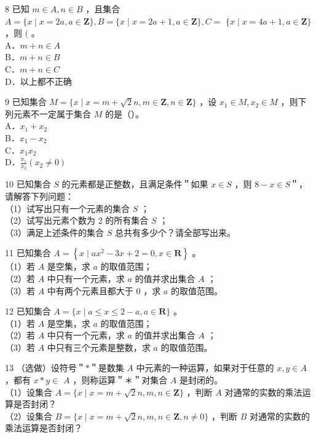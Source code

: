 \documentclass[10pt]{article}
\begin{document}
8 已知 \(m \in A, n \in B\) ，且集合 \(A=\{x \mid x=2 a, a \in \mathbf{Z}\}, B=\{x \mid x=2 a+1, a \in \mathbf{Z}\}, C=\) \(\{x \mid x=4 a+1, a \in \mathbf{Z}\}\) ，则 \((\) 。\\
A．\(m+n \in A\)\\
B．\(m+n \in B\)\\
C．\(m+n \in C\)\\
D．以上都不正确

9 已知集合 \(M=\{x \mid x=m+\sqrt{2} n, m \in \mathbf{Z}, n \in \mathbf{Z}\}\) ，设 \(x_{1} \in M, x_{2} \in M\) ，则下列元素不一定属于集合 \(M\) 的是（）。\\
A．\(x_{1}+x_{2}\)\\
B．\(x_{1}-x_{2}\)\\
C．\(x_{1} x_{2}\)\\
D．\(\frac{x_{1}}{x_{2}}\left(x_{2} \neq 0\right)\)

10 已知集合 \(S\) 的元素都是正整数，且满足条件＂如果 \(x \in S\) ，则 \(8-x \in S\)＂，请解答下列问题：\\
（1）试写出只有一个元素的集合 \(S\) ；\\
（2）试写出元素个数为 2 的所有集合 \(S\) ；\\
（3）满足上述条件的集合 \(S\) 总共有多少个？请全部写出来。

11 已知集合 \(A=\left\{x \mid a x^{2}-3 x+2=0, x \in \mathbf{R}\right\}\) 。\\
（1）若 \(A\) 是空集，求 \(a\) 的取值范围；\\
（2）若 \(A\) 中只有一个元素，求 \(a\) 的值并求出集合 \(A\) ；\\
（3）若 \(A\) 中有两个元素且都大于 0 ，求 \(a\) 的取值范围。

12 已知集合 \(A=\{x \mid a \leqslant x \leqslant 2-a, a \in \mathbf{R}\}\) 。\\
（1）若 \(A\) 是空集，求 \(a\) 的取值范围；\\
（2）若 \(A\) 中只有一个元素，求 \(a\) 的值并求出集合 \(A\) ；\\
（3）若 \(A\) 中只有三个元素是整数，求 \(a\) 的取值范围。

13 （选做）设符号＂\(*\)＂是数集 \(A\) 中元素的一种运算，如果对于任意的 \(x, y \in A\) ，都有 \(x * y \in\) \(A\) ，则称运算＂＊＂对集合 \(A\) 是封闭的。\\
（1）设集合 \(A=\{x \mid x=m+\sqrt{2} n, m, n \in \mathbf{Z}\}\) ，判断 \(A\) 对通常的实数的乘法运算是否封闭？\\
（2）设集合 \(B=\{x \mid x=m+\sqrt{2} n, m, n \in \mathbf{Z}, n \neq 0\}\) ，判断 \(B\) 对通常的实数的乘法运算是否封闭？
\end{document}
